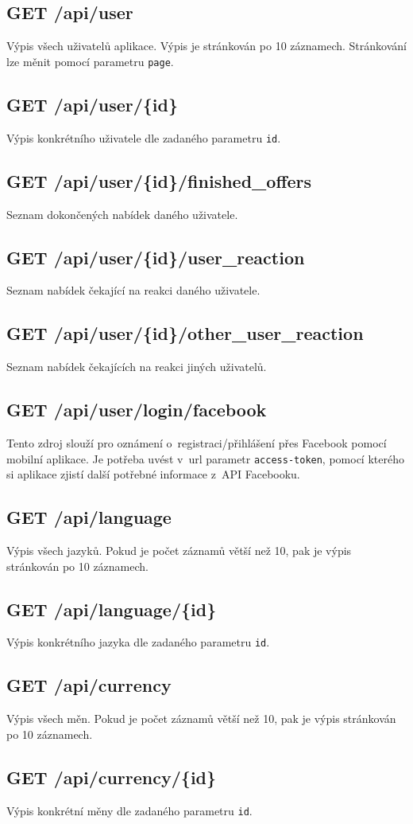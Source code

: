 \subsection{GET /api/user}
Výpis všech uživatelů aplikace. Výpis je stránkován po 10 záznamech. Stránkování lze měnit pomocí parametru \texttt{page}.

\subsection{GET /api/user/\{id\}}
Výpis konkrétního uživatele dle zadaného parametru \texttt{id}.

\subsection{GET /api/user/\{id\}/finished\_offers}
Seznam dokončených nabídek daného uživatele.

\subsection{GET /api/user/\{id\}/user\_reaction}
Seznam nabídek čekající na reakci daného uživatele.

\subsection{GET /api/user/\{id\}/other\_user\_reaction}
Seznam nabídek čekajících na reakci jiných uživatelů.

\subsection{GET /api/user/login/facebook}
Tento zdroj slouží pro oznámení o~registraci/přihlášení přes Facebook pomocí mobilní aplikace. Je potřeba uvést v~url parametr \texttt{access-token}, pomocí kterého si aplikace zjistí další potřebné informace z~API Facebooku.

\subsection{GET /api/language}
Výpis všech jazyků. Pokud je počet záznamů větší než 10, pak je výpis stránkován po 10 záznamech.

\subsection{GET /api/language/\{id\}}
Výpis konkrétního jazyka dle zadaného parametru \texttt{id}.

\subsection{GET /api/currency}
Výpis všech měn. Pokud je počet záznamů větší než 10, pak je výpis stránkován po 10 záznamech.

\subsection{GET /api/currency/\{id\}}
Výpis konkrétní měny dle zadaného parametru \texttt{id}.